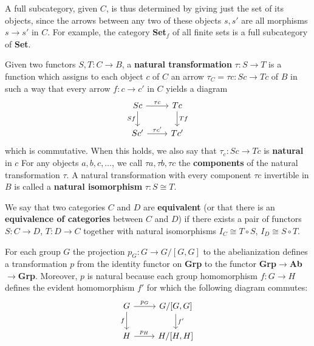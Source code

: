 \documentclass{../../mathnotes}
\begin{document}
\begin{rem}
    A full subcategory, given $C$, is thus determined by giving just the set of its objects, since the arrows between
    any two of these objects $s,s'$ are all morphisms $s\to s'$ in $C$. For example, the category \textbf{Set$_f$} of
    all finite sets is a full subcategory of \textbf{Set}.
\end{rem}

\begin{defn}
    Given two functors $S,T:C\to B$, a \textbf{natural transformation} $\tau:S\to T$ is a function which assigns
    to each object $c$ of $C$ an arrow $\tau_C=\tau c:Sc\to Tc$ of $B$ in such a way that every arrow $f:c\to c'$
    in $C$ yields a diagram
    \begin{equation*}
        \begin{tikzcd}
            Sc\ar{r}{\tau c}\ar[swap]{d}{Sf} & Tc\ar{d}{Tf}\\
            Sc'\ar{r}{\tau c'} & Tc'
        \end{tikzcd}
    \end{equation*}
    which is commutative. When this holds, we also say that $\tau_c:Sc\to Tc$ is \textbf{natural} in $c$
    For any objects $a,b,c,\ldots$, we call $\tau a,\tau b,\tau c$ the \textbf{components} of the natural transformation
    $\tau$. A natural transformation with every component $\tau c$ invertible in $B$ is called a
    \textbf{natural isomorphism} $\tau:S\cong T$.
\end{defn}

\begin{defn}
    We say that two categories $C$ and $D$ are \textbf{equivalent} (or that there is an \textbf{equivalence of categories}
    between $C$ and $D$) if there exists a pair of functors $S:C\to D$, $T:D\to C$ together with
    natural isomorphisms $I_C\cong T\circ S$, $I_D\cong S\circ T$.
\end{defn}

\begin{exmp}
    For each group $G$ the projection $p_G:G\to G/[G,G]$ to the abelianization defines a transformation $p$
    from the identity functor on \textbf{Grp} to the functor \textbf{Grp}$\to$\textbf{Ab}$\to$\textbf{Grp}.
    Moreover, $p$ is natural because each group homomorphism $f:G\to H$ defines the evident homomorphism $f'$
    for which the following diagram commutes:
    \begin{equation*}
        \begin{tikzcd}
            G\ar{r}{p_G}\ar[swap]{d}{f} & G/[G,G]\ar{d}{f'}\\
            H\ar{r}{p_H} & H/[H,H]
        \end{tikzcd}
    \end{equation*}
\end{exmp}
\end{document}
